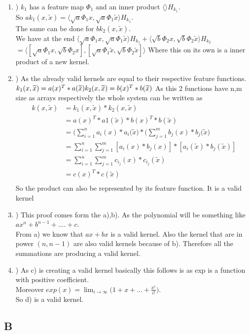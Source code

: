 \begin{enumerate}[label=\alph*]
\item) $k_1$ has a feature map $\Phi_1$ and an inner product $\langle\rangle H_{k_1}$.\\
So $ak_1(x,\widetilde{x}) = \langle \sqrt{a}\Phi_1{x}, \sqrt{a}\Phi_1{\widetilde{x}} \rangle H_{k_1}$. \\
The same can be done for $bk_2(x,\widetilde{x})$.\\
We have at the end 
$\langle \sqrt{a}\Phi_1{x}, \sqrt{a}\Phi_1{\widetilde{x}} \rangle H_{k_1} + \langle \sqrt{b}\Phi_2{x}, \sqrt{b}\Phi_2{\widetilde{x}} \rangle H_{k_2}$\\
$= \langle [\sqrt{a}\Phi_1{x},\sqrt{b}\Phi_2{x}], [\sqrt{a}\Phi_1{\widetilde{x}},\sqrt{b}\Phi_2{\widetilde{x}}] \rangle$
Where this on its own is a inner product of a new kernel.
\item) As the already valid kernels are equal to their respective feature functions.
$k_1(x,\widetilde{x}) = a(x)^T*a(\widetilde{x})\\
k_2(x,\widetilde{x}) = b(x)^T*b(\widetilde{x})$
As this 2 functions have n,m size as arrays respectively the whole system can be written as
\begin{align*}
k(x,\widetilde{x}) &= k_1(x,\widetilde{x})*k_2(x,\widetilde{x})\\
		   &= a(x)^T*a1(\widetilde{x}) * b(x)^T*b(\widetilde{x})\\
		   &= \Big( \sum_{i=1}^{n} a_i(x)*a_i(\widetilde{x} \Big)*\Big( \sum_{j=1}^{m} b_j(x)*b_j(\widetilde{x} \Big)\\
		   &= \sum_{i=1}^{n}\sum_{j=1}^{m}[a_i(x)*b_j(x)] * [a_i(\widetilde{x})*b_j(\widetilde{x})]\\
		   &= \sum_{i=1}^{n}\sum_{j=1}^{m} c_{i_j}(x)*c_{i_j}(\widetilde{x})\\
		   &= c(x)^T*c(\widetilde{x})\\
\end{align*}
So the product can also be represented by its feature function. It is a valid kernel
\item) This proof comes form the a),b). As the polynomial will be something like $ax^n+b^{n-1}+....+c$.\\
From a) we know that $ax+bx$ is a valid kernel. Also the kernel that are in power $(n,n-1)$ are also valid kernels
because of b). Therefore all the summations are producing a valid kernel.
\item) As c) is creating a valid kernel basically this follows is as exp is a function with positive coefficient.\\
Moreover $exp(x) = \lim_{i \to \infty} \big( 1+x+ \ldots + \frac{x^i}{i!} \big)$.\\
So d) is a valid kernel.
\end{enumerate}
\subsection{B}
